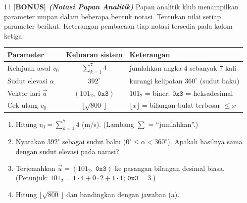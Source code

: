 \documentclass[11pt]{article}
\newenvironment{subsoal}{%
  \begin{enumerate}[label=\textbf{(\alph*)},leftmargin=1.8em,itemsep=5pt,topsep=3pt]}%
  {\end{enumerate}}
\begin{document}
\bigskip

\begin{soal}{11 \normalfont\bfseries[BONUS] \normalfont\itshape(Notasi Papan Analitik)}
Papan analitik klub menampilkan parameter umpan dalam beberapa bentuk notasi.
Tentukan nilai setiap parameter berikut. Keterangan pembacaan tiap notasi tersedia
pada kolom ketiga.

\smallskip
\begin{center}\small
\renewcommand{\arraystretch}{1.5}
\begin{tabular}{@{}l c p{5.7cm}@{}}
\toprule
\textbf{Parameter} & \textbf{Keluaran sistem} & \textbf{Keterangan} \\
\midrule
Kelajuan awal $v_0$ & $\sum_{k=1}^{7}4$ & jumlahkan angka $4$ sebanyak $7$ kali \\
Sudut elevasi $\alpha$ & $392^\circ$ & kurangi kelipatan $360^\circ$ (sudut baku) \\
Vektor lari $\vec{u}$ & $(101_2,\ \mathtt{0x3})$ & $101_2$ = biner; $\mathtt{0x3}$ = heksadesimal \\
Cek ulang $v_0$ & $\lfloor\sqrt{800}\,\rfloor$ & $\lfloor x\rfloor$ = bilangan bulat terbesar $\le x$ \\
\bottomrule
\end{tabular}
\end{center}

\begin{subsoal}
  \item Hitung $v_0=\displaystyle\sum_{k=1}^{7}4$ (m/s). (Lambang $\sum$ = ``jumlahkan''.)
  \item Nyatakan $392^\circ$ sebagai sudut baku ($0^\circ\le\alpha<360^\circ$).
        Apakah hasilnya sama dengan sudut elevasi pada narasi?
  \item Terjemahkan $\vec{u}=(101_2,\ \mathtt{0x3})$ ke pasangan bilangan desimal
        biasa. (Petunjuk: $101_2=1\cdot4+0\cdot2+1\cdot1$; $\mathtt{0x3}=3$.)
  \item Hitung $\lfloor\sqrt{800}\,\rfloor$ dan bandingkan dengan jawaban (a).
\end{subsoal}
\end{soal}
\end{document}
